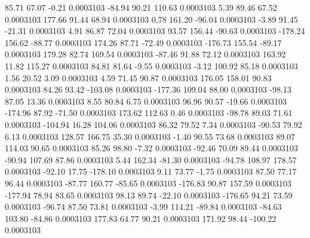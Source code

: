        85.71       67.07       -0.21     0.0003103
      -84.94       90.21      110.63     0.0003103
        5.39       89.46       67.52     0.0003103
      177.66       91.44       68.94     0.0003103
        0.78      161.20      -96.04     0.0003103
       -3.89       91.45      -21.31     0.0003103
        4.91       86.87       72.04     0.0003103
       93.57      156.44      -90.63     0.0003103
     -178.24      156.62      -88.77     0.0003103
      174.26       87.71      -72.49     0.0003103
     -176.73      155.54      -89.17     0.0003103
      179.28       82.74      169.54     0.0003103
      -87.46       91.88       72.12     0.0003103
      163.92       11.82      115.27     0.0003103
       84.81       81.64       -9.55     0.0003103
       -3.12      100.92       85.18     0.0003103
        1.56       20.52        3.09     0.0003103
        4.59       71.45       90.87     0.0003103
      176.05      158.01       90.83     0.0003103
       84.26       93.42     -103.08     0.0003103
     -177.36      109.04       88.00     0.0003103
      -98.13       87.05       13.36     0.0003103
        8.55       80.84        6.75     0.0003103
       96.96       90.57      -19.66     0.0003103
     -174.96       87.92      -71.50     0.0003103
      173.62      112.63        0.46     0.0003103
      -98.78       89.03       71.61     0.0003103
     -104.94       16.28      104.06     0.0003103
       86.32       79.52        7.34     0.0003103
      -90.53       79.92        6.13     0.0003103
      128.57      166.75       35.30     0.0003103
       -1.40       90.55       73.68     0.0003103
       89.07      114.03       90.65     0.0003103
       85.26       98.80       -7.32     0.0003103
      -92.46       70.09       89.44     0.0003103
      -90.94      107.69       87.86     0.0003103
        5.44      162.34      -81.30     0.0003103
      -94.78      108.97      178.57     0.0003103
      -92.10       17.75     -178.10     0.0003103
        9.11       73.77       -1.75     0.0003103
       87.50       77.17       96.44     0.0003103
      -87.77      160.77      -85.65     0.0003103
     -176.83       90.87      157.59     0.0003103
     -177.94       78.94       83.65     0.0003103
       98.13       89.74      -22.10     0.0003103
     -176.65       94.21       73.59     0.0003103
      -96.74       87.50       73.81     0.0003103
       -3.99      114.21      -89.84     0.0003103
      -84.63      103.80      -84.86     0.0003103
      177.83       64.77       90.21     0.0003103
      171.92       98.44     -100.22     0.0003103
